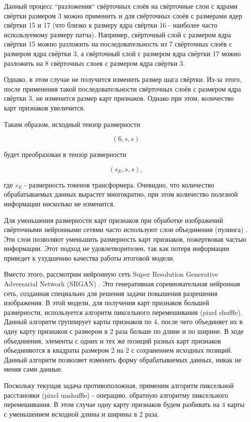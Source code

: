 Данный процесс ``разложения`` свёрточных слоёв на свёрточные слои с ядрами свёртки размером 3 можно применить и для свёрточных слоёв с размерами ядер свёртки 15 и 17 (что близко к размеру ядра свёртки 16 - наиболее часто используемому размеру патча). Например, свёрточный слой с размером ядра свёртки 15 можно разложить на последовательность из 7 свёрточных слоёв с размером ядра свёртки 3, а свёрточный слой с размером ядра свёртки 17 можно разложить на 8 свёрточных слоев с размером ядра свёртки 3. 

Однако, в этом случае не получится изменить размер шага свёртки. Из-за этого, после применения такой последовательности свёрточных слоёв с размером ядра свёртки 3, не изменится размер карт признаков. Однако при этом, количество карт признаков увеличится.

Таким образом, исходный тензор размерности

$$(6, s, s)$$

будет преобразован в тензор размерности 

$$
(s_E, s, s),
$$

где $s_E$ - размерность токенов трансформера. Очевидно, что количество обрабатываемых данных вырастет многократно, при этом количество полезной информации нисколько не изменится. 

Для уменьшения размерности карт признаков при обработке изображений свёрточными нейронными сетями часто используют слои объединения (пулинга) \cite{goodfellow_dl}. Эти слои позволяют уменьшить размерность карт признаков, пожертвовав частью информации. Этот подход не удовлетворителен, так как потеря информации приведет к ухудшению качества работы итоговой модели. 

Вместо этого, рассмотрим нейронную сеть Super Resolution Generative Adversarial Network (SRGAN) \cite{srgan}. Это генеративная соревновательная нейронная сеть, созданная специально для решения задачи повышения разрешения изображения. В этой модели, для получения карт признаков большей размерности, используется алгоритм пиксельного перемешивания (pixel shuffle). Данный алгоритм группирует карты признаков по 4, после чего объединяет их в одну карту признаков с размером в 2 раза больше по длине и по ширине. В ходе объединения, элементы с одних и тех же позиций разных карт признаков объединяются в квадраты размером 2 на 2 с сохранением исходных позиций. Данный алгоритм позволяет изменить форму обрабатываемых данных, никак не меняя сами данные.

Поскольку текущая задача противоположная, применим алгоритм пиксельной расстановки (pixel unshuffle) - операцию, обратную алгоритму пиксельного перемешивания. В этом случае одну карту признаков будем разбивать на 4 карты с уменьшением исходной длины и ширины в 2 раза. 

